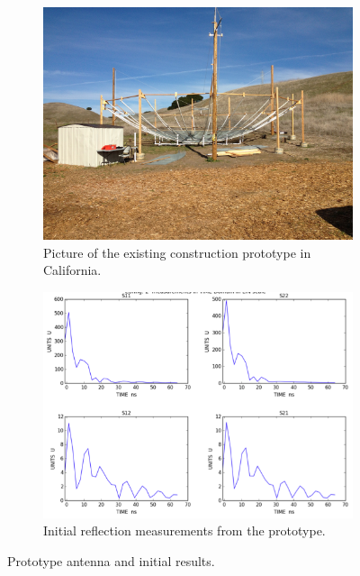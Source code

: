 \documentclass[preprint]{aastex}
\begin{document}
\begin{figure}[h]
	\centering
	\begin{subfigure}[b]{0.46\textwidth}
		\includegraphics[width=\textwidth]{plots/heracles.png}
		\caption{Picture of the existing construction prototype in California.}
	\end{subfigure}
	\quad
	\begin{subfigure}[b]{0.46\textwidth}
		\includegraphics[width=\textwidth]{plots/Engineering/heraclesNA.png}
		\caption{Initial reflection measurements from the prototype.}
	\end{subfigure}
	\caption{Prototype antenna and initial results.}
	\label{fig:heracles}
\end{figure}
\end{document}

